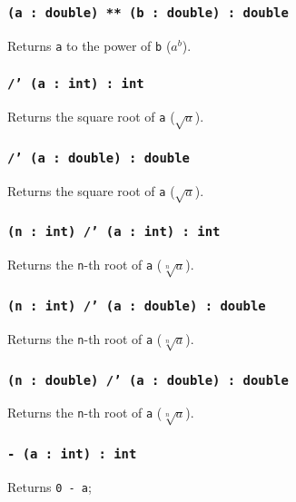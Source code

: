 \subsubsection{\texttt{(a : double) ** (b : double) : double}}

Returns \texttt{a} to the power of \texttt{b} ($a^b$).

\subsubsection{\texttt{/' (a : int) : int}}

Returns the square root of \texttt{a} ($\sqrt{a}$).

\subsubsection{\texttt{/' (a : double) : double}}

Returns the square root of \texttt{a} ($\sqrt{a}$).

\subsubsection{\texttt{(n : int) /' (a : int) : int}}

Returns the \texttt{n}-th root of \texttt{a} ($\sqrt[n]{a}$).

\subsubsection{\texttt{(n : int) /' (a : double) : double}}

Returns the \texttt{n}-th root of \texttt{a} ($\sqrt[n]{a}$).

\subsubsection{\texttt{(n : double) /' (a : double) : double}}

Returns the \texttt{n}-th root of \texttt{a} ($\sqrt[n]{a}$).


\subsubsection{\texttt{- (a : int) : int}}

Returns \texttt{0 - a};

